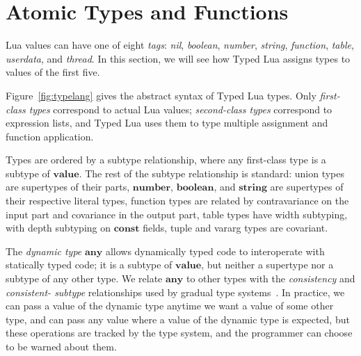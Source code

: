 \documentclass{sig-alternate}
\newcommand{\Any}{\mathbf{any}}
\newcommand{\Top}{\mathbf{value}}
\newcommand{\Boolean}{\mathbf{boolean}}
\newcommand{\Number}{\mathbf{number}}
\newcommand{\String}{\mathbf{string}}
\newcommand{\Const}{\mathbf{const}}
\begin{document}
\section{Atomic Types and Functions}
\label{sec:atomic}

Lua values can have one of eight {\em tags}: {\em nil}, {\em boolean},
{\em number}, {\em string}, {\em function}, {\em table}, {\em userdata},
and {\em thread}. In this section, we will see how Typed Lua assigns types to
values of the first five.

Figure~\ref{fig:typelang} gives the abstract syntax of Typed Lua
types. Only {\em first-class types} correspond to actual Lua
values; {\em second-class types} correspond to expression lists,
and Typed Lua uses them to type multiple assignment and function
application.

Types are ordered by a subtype relationship, where
any first-class type is a subtype of $\Top$. The rest of the 
subtype relationship is standard: union types are supertypes
of their parts, $\Number$, $\Boolean$, and $\String$ are
supertypes of their respective literal types, function
types are related by contravariance on the input part and
covariance in the output part, table types have width
subtyping, with depth subtyping on $\Const$ fields,
tuple and vararg types are covariant.

The {\em dynamic type} $\Any$ allows dynamically typed code to
interoperate with statically typed code; it is a subtype of 
$\Top$, but
neither a supertype nor a subtype of any other type. We relate 
$\Any$
to other types with the {\em consistency} and {\em consistent-
subtype}
relationships used by gradual type systems~\citep{siek2006gradual,siek2007objects}.
 In practice, we can
pass a value of the dynamic type anytime we want a value of some
other type, and can pass any value where a value of the dynamic type
is expected, but these operations are tracked by the type system,
and the programmer can choose to be warned about them.
\end{document}
